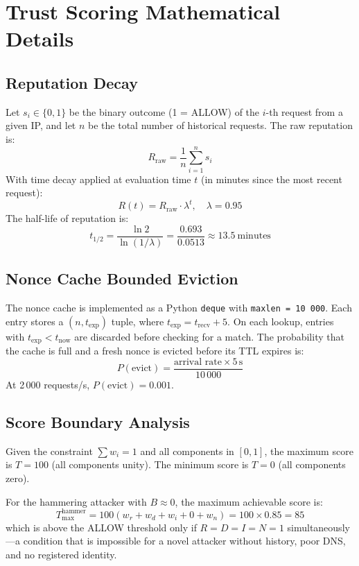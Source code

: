 \documentclass[10pt,conference]{IEEEtran}
\begin{document}
\section{Trust Scoring Mathematical Details}
\label{app:math}

\subsection{Reputation Decay}

Let $s_i \in \{0, 1\}$ be the binary outcome (1 = ALLOW) of the
$i$-th request from a given IP, and let $n$ be the total number of
historical requests.  The raw reputation is:
\[
  R_{\mathrm{raw}} = \frac{1}{n} \sum_{i=1}^{n} s_i
\]
With time decay applied at evaluation time $t$ (in minutes since the
most recent request):
\[
  R(t) = R_{\mathrm{raw}} \cdot \lambda^{t}, \quad \lambda = 0.95
\]
The half-life of reputation is:
\[
  t_{1/2} = \frac{\ln 2}{\ln(1/\lambda)} = \frac{0.693}{0.0513}
           \approx 13.5\ \text{minutes}
\]

\subsection{Nonce Cache Bounded Eviction}

The nonce cache is implemented as a Python \texttt{deque} with
\texttt{maxlen = 10\,000}.  Each entry stores a $(n, t_{\mathrm{exp}})$
tuple, where $t_{\mathrm{exp}} = t_{\mathrm{recv}} + 5$.  On each
lookup, entries with $t_{\mathrm{exp}} < t_{\mathrm{now}}$ are
discarded before checking for a match.  The probability that the cache
is full and a fresh nonce is evicted before its TTL expires is:
\[
  P(\text{evict}) = \frac{\text{arrival rate} \times 5\,\text{s}}
                        {10\,000}
\]
At 2\,000 requests/s, $P(\text{evict}) = 0.001$.

\subsection{Score Boundary Analysis}

Given the constraint $\sum w_i = 1$ and all components in $[0,1]$,
the maximum score is $T = 100$ (all components unity).  The minimum
score is $T = 0$ (all components zero).

For the hammering attacker with $B \approx 0$, the maximum achievable
score is:
\[
  T_{\max}^{\mathrm{hammer}} = 100(w_r + w_d + w_i + 0 + w_n)
  = 100 \times 0.85 = 85
\]
which is above the ALLOW threshold only if $R = D = I = N = 1$
simultaneously—a condition that is impossible for a novel attacker
without history, poor DNS, and no registered identity.
\end{document}

